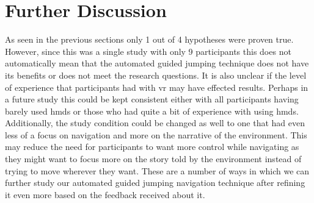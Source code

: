 \section{Further Discussion}
\label{subsection EUS: Further Discussion}
As seen in the previous sections only 1 out of 4 hypotheses were proven true. However, since this was a single study with only 9 participants this does not automatically mean that the automated guided jumping technique does not have its benefits or does not meet the research questions. It is also unclear if the level of experience that participants had with \acrshort{vr} may have effected results. Perhaps in a future study this could be kept consistent either with all participants having barely used \acrshort{hmd}s or those who had quite a bit of experience with using \acrshort{hmd}s. Additionally, the study condition could be changed as well to one that had even less of a focus on navigation and more on the narrative of the environment. This may reduce the need for participants to want more control while navigating as they might want to focus more on the story told by the environment instead of trying to move wherever they want. These are a number of ways in which we can further study our automated guided jumping navigation technique after refining it even more based on the feedback received about it.